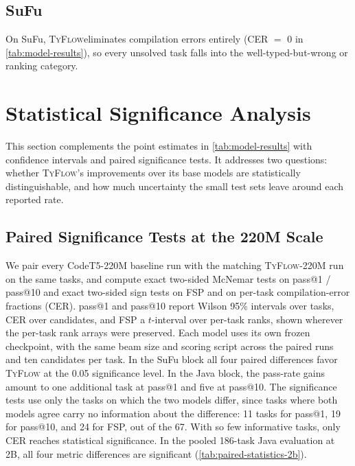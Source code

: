 \documentclass[manuscript,screen]{acmart}
\newcommand{\toolname}[1]{\textsc{#1}}
\newcommand{\mainname}{\toolname{TyFlow}\xspace}
\begin{document}
\subsection{{\color{revblue}SuFu}}

{\color{revblue}On SuFu, }\mainname {\color{revblue}eliminates compilation errors entirely (CER $=$ 0 in }\autoref{tab:model-results}{\color{revblue}), so every unsolved task falls into the well-typed-but-wrong or ranking category.
}

\section{{\color{revblue}Statistical Significance Analysis}}
\label{appendix-statistics}

{\color{revblue}This section complements the point estimates in }\autoref{tab:model-results} {\color{revblue}with confidence intervals and paired significance tests. It addresses two questions: whether }\mainname{\color{revblue}'s improvements over its base models are statistically distinguishable, and how much uncertainty the small test sets leave around each reported rate.
}

\subsection{{\color{revblue}Paired Significance Tests at the 220M Scale}}
\label{appendix-statistics-220m}

{\color{revblue}We pair every CodeT5-220M baseline run with the matching }\mainname{\color{revblue}-220M run on the same tasks, and compute exact two-sided McNemar tests on pass@1 / pass@10 and exact two-sided sign tests on FSP and on per-task compilation-error fractions (CER).
pass@1 and pass@10 report Wilson 95\% intervals over tasks, CER over candidates, and FSP a $t$-interval over per-task ranks, shown wherever the per-task rank arrays were preserved. Each model uses its own frozen checkpoint, with the same beam size and scoring script across the paired runs and ten candidates per task.
In the SuFu block all four paired differences favor }\mainname{} {\color{revblue}at the 0.05 significance level.
In the Java block, the pass-rate gains amount to one additional task at pass@1 and five at pass@10. The significance tests use only the tasks on which the two models differ, since tasks where both models agree carry no information about the difference: 11 tasks for pass@1, 19 for pass@10, and 24 for FSP, out of the 67. With so few informative tasks, only CER reaches statistical significance. In the pooled 186-task Java evaluation at 2B, all four metric differences are significant (}\autoref{tab:paired-statistics-2b}{\color{revblue}).
}
\end{document}
